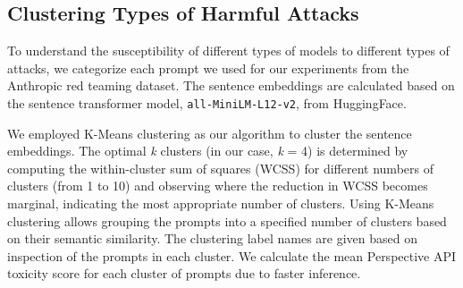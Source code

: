 \subsection{Clustering Types of Harmful Attacks}
To understand the susceptibility of different types of models to different types of attacks, we categorize each prompt we used for our experiments from the Anthropic red teaming dataset. The sentence embeddings are calculated based on the sentence transformer model, \texttt{all-MiniLM-L12-v2}, from HuggingFace. 

We employed K-Means clustering as our algorithm to cluster the sentence embeddings. The optimal \textit{k} clusters (in our case, \textit{k} = 4) is determined by computing the within-cluster sum of squares (WCSS) for different numbers of clusters (from 1 to 10) and observing where the reduction in WCSS becomes marginal, indicating the most appropriate number of clusters. Using K-Means clustering allows grouping the prompts into a specified number of clusters based on their semantic similarity.
The clustering label names are given based on inspection of the prompts in each cluster. We calculate the mean Perspective API toxicity score for each cluster of prompts due to faster inference. 